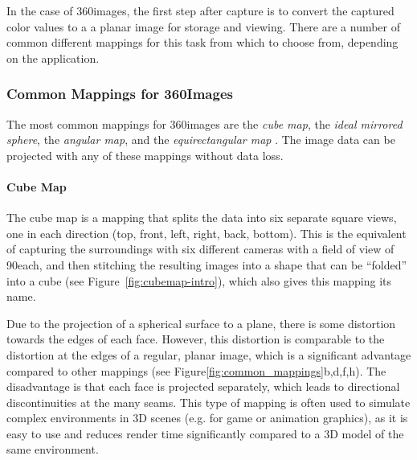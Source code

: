 In the case of 360\degree images, the first step after capture is to convert the captured color values to a a planar image for storage and viewing. There are a number of common different mappings for this task from which to choose from, depending on the application.

\subsubsection{Common Mappings for 360\degree Images \cite{hdrbook}}\label{subsec:projections}
The most common mappings for 360\degree images are the \emph{cube map}, the \emph{ideal mirrored sphere}, the \emph{angular map},  and the \emph{equirectangular map} \cite{hdrbook}. The image data can be projected with any of these mappings without data loss.

\paragraph{Cube Map}
The cube map is a mapping that splits the data into six separate square views, one in each direction (top, front, left, right, back, bottom). This is the equivalent of capturing the surroundings with six different cameras with a field of view of 90\degree each, and then stitching the resulting images into a shape that can be ``folded'' into a cube (see Figure~\ref{fig:cubemap-intro}), which also gives this mapping its name.

Due to the projection of a spherical surface to a plane, there is some distortion towards the edges of each face. However, this distortion is comparable to the distortion at the edges of a regular, planar image, which is a significant advantage compared to other mappings (see Figure\ref{fig:common_mappings}b,d,f,h\footnotemark). The disadvantage is that each face is projected separately, which leads to directional discontinuities at the many seams. This type of mapping is often used to simulate complex environments in 3D scenes (e.g. for game or animation graphics), as it is easy to use and reduces render time significantly compared to a 3D model of the same environment.

\cite{hdrbook}

